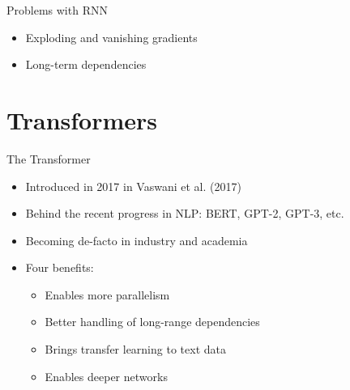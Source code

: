 \documentclass[10pt]{beamer}
\begin{document}
\begin{frame}{Problems with RNN}

\begin{itemize}
\item {\color{uured} Exploding and vanishing} gradients
\item {\color{uured} Long-term} dependencies
\end{itemize}

\end{frame}




% 



\section{Transformers}
\frame{\sectionpage}

\begin{frame}{The Transformer}

\begin{itemize}
\item Introduced in 2017 in Vaswani et al. (2017)
\item Behind the recent progress in NLP: BERT, GPT-2, GPT-3, etc.
\pause
\item Becoming de-facto  in industry and academia
\pause
\item Four benefits:
\begin{itemize}
\item Enables more {\color{uured} parallelism}
\item Better handling of {\color{uured} long-range dependencies}
\item Brings {\color{uured} transfer learning} to text data
\item Enables {\color{uured} deeper} networks
\end{itemize}
\end{itemize}

\end{frame}
\end{document}
